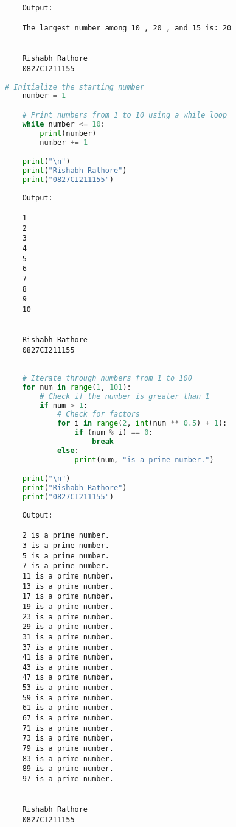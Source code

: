 \documentclass{report}
\begin{document}
\begin{verbatim}
	Output:

	The largest number among 10 , 20 , and 15 is: 20


	Rishabh Rathore
	0827CI211155
\end{verbatim}
\newpage


\sol{}
\begin{lstlisting}[language=Python]
	# Initialize the starting number
	number = 1

	# Print numbers from 1 to 10 using a while loop
	while number <= 10:
		print(number)
		number += 1

	print("\n")
	print("Rishabh Rathore")
	print("0827CI211155")

\end{lstlisting}

\begin{verbatim}
	Output:

	1
	2
	3
	4
	5
	6
	7
	8
	9
	10
	
	
	Rishabh Rathore
	0827CI211155
\end{verbatim}
\newpage


\sol{}
\begin{lstlisting}[language=Python]

	# Iterate through numbers from 1 to 100
	for num in range(1, 101):
		# Check if the number is greater than 1
		if num > 1:
			# Check for factors
			for i in range(2, int(num ** 0.5) + 1):
				if (num % i) == 0:
					break
			else:
				print(num, "is a prime number.")

	print("\n")
	print("Rishabh Rathore")
	print("0827CI211155")
\end{lstlisting}

\begin{verbatim}
	Output:

	2 is a prime number.
	3 is a prime number.
	5 is a prime number.
	7 is a prime number.
	11 is a prime number.
	13 is a prime number.
	17 is a prime number.
	19 is a prime number.
	23 is a prime number.
	29 is a prime number.
	31 is a prime number.
	37 is a prime number.
	41 is a prime number.
	43 is a prime number.
	47 is a prime number.
	53 is a prime number.
	59 is a prime number.
	61 is a prime number.
	67 is a prime number.
	71 is a prime number.
	73 is a prime number.
	79 is a prime number.
	83 is a prime number.
	89 is a prime number.
	97 is a prime number.
	
	
	Rishabh Rathore
	0827CI211155
\end{verbatim}
\newpage
\end{document}
